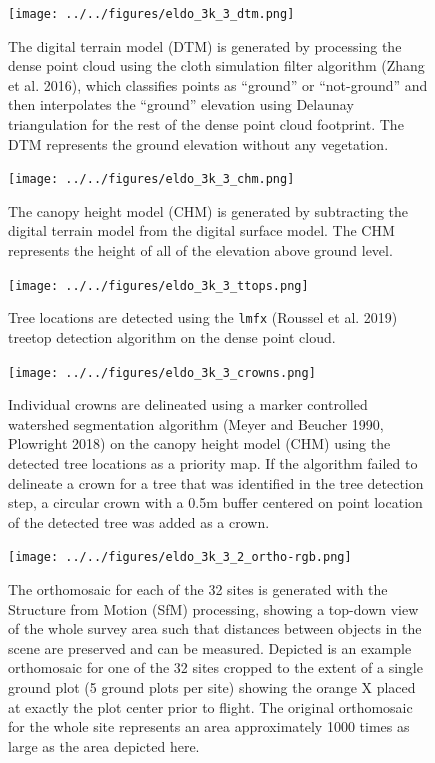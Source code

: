 \documentclass[]{article}
\begin{document}
\begin{figure}
\centering
\texttt{[image: ../../figures/eldo\_3k\_3\_dtm.png]}
\caption{The digital terrain model (DTM) is generated by processing the
dense point cloud using the cloth simulation filter algorithm (Zhang et
al. 2016), which classifies points as ``ground'' or ``not-ground'' and
then interpolates the ``ground'' elevation using Delaunay triangulation
for the rest of the dense point cloud footprint. The DTM represents the
ground elevation without any vegetation.}
\end{figure}

\begin{figure}
\centering
\texttt{[image: ../../figures/eldo\_3k\_3\_chm.png]}
\caption{The canopy height model (CHM) is generated by subtracting the
digital terrain model from the digital surface model. The CHM represents
the height of all of the elevation above ground level.}
\end{figure}

\begin{figure}
\centering
\texttt{[image: ../../figures/eldo\_3k\_3\_ttops.png]}
\caption{Tree locations are detected using the \texttt{lmfx} (Roussel et
al. 2019) treetop detection algorithm on the dense point cloud.}
\end{figure}

\begin{figure}
\centering
\texttt{[image: ../../figures/eldo\_3k\_3\_crowns.png]}
\caption{Individual crowns are delineated using a marker controlled
watershed segmentation algorithm (Meyer and Beucher 1990, Plowright
2018) on the canopy height model (CHM) using the detected tree locations
as a priority map. If the algorithm failed to delineate a crown for a
tree that was identified in the tree detection step, a circular crown
with a 0.5m buffer centered on point location of the detected tree was
added as a crown.}
\end{figure}

\begin{figure}
\centering
\texttt{[image: ../../figures/eldo\_3k\_3\_2\_ortho-rgb.png]}
\caption{The orthomosaic for each of the 32 sites is generated with the
Structure from Motion (SfM) processing, showing a top-down view of the
whole survey area such that distances between objects in the scene are
preserved and can be measured. Depicted is an example orthomosaic for
one of the 32 sites cropped to the extent of a single ground plot (5
ground plots per site) showing the orange X placed at exactly the plot
center prior to flight. The original orthomosaic for the whole site
represents an area approximately 1000 times as large as the area
depicted here.}
\end{figure}
\end{document}
